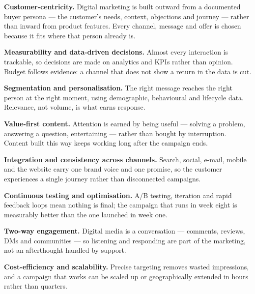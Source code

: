 \partb

\begin{qlist}

\begin{apts}
\item \textbf{Customer-centricity.} Digital marketing is built outward from a
      documented buyer persona --- the customer's needs, context, objections
      and journey --- rather than inward from product features. Every channel,
      message and offer is chosen because it fits where that person already is.
\item \textbf{Measurability and data-driven decisions.} Almost every
      interaction is trackable, so decisions are made on analytics and KPIs
      rather than opinion. Budget follows evidence: a channel that does not
      show a return in the data is cut.
\item \textbf{Segmentation and personalisation.} The right message reaches the
      right person at the right moment, using demographic, behavioural and
      lifecycle data. Relevance, not volume, is what earns response.
\item \textbf{Value-first content.} Attention is earned by being useful ---
      solving a problem, answering a question, entertaining --- rather than
      bought by interruption. Content built this way keeps working long after
      the campaign ends.
\item \textbf{Integration and consistency across channels.} Search, social,
      e-mail, mobile and the website carry one brand voice and one promise, so
      the customer experiences a single journey rather than disconnected
      campaigns.
\item \textbf{Continuous testing and optimisation.} A/B testing, iteration and
      rapid feedback loops mean nothing is final; the campaign that runs in
      week eight is measurably better than the one launched in week one.
\item \textbf{Two-way engagement.} Digital media is a conversation ---
      comments, reviews, DMs and communities --- so listening and responding
      are part of the marketing, not an afterthought handled by support.
\item \textbf{Cost-efficiency and scalability.} Precise targeting removes
      wasted impressions, and a campaign that works can be scaled up or
      geographically extended in hours rather than quarters.
\end{apts}


\end{qlist}
